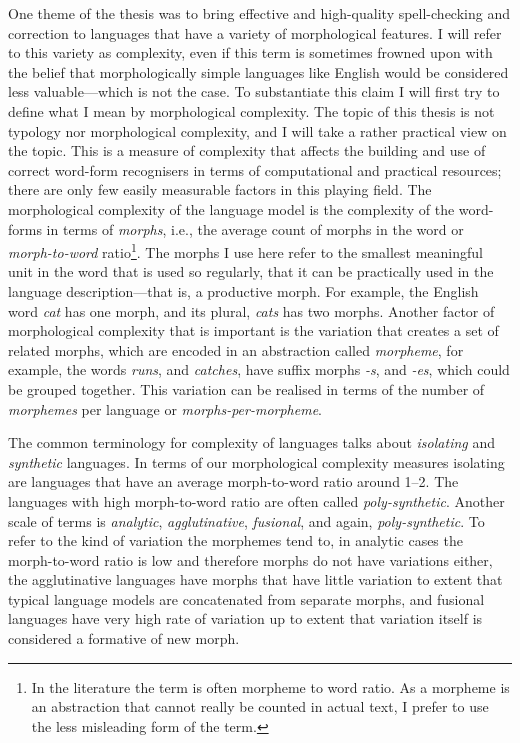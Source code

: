 \documentclass[officiallayout]{unihelcompling}
\begin{document}
One theme of the thesis was to bring effective and high-quality spell-checking
and correction
to languages that have a variety of morphological features. I will refer to
this variety as complexity, even if this term is sometimes frowned upon with
the belief that morphologically simple languages like English would be
considered less valuable---which is not the case.  To substantiate this claim I
will first try to define what I mean by morphological complexity. The topic of
this thesis is not typology nor morphological complexity, and I will take a
rather practical view on the topic.  This is a measure of complexity that
affects the building and use of correct word-form recognisers in terms of
computational and practical resources; there are only few easily measurable
factors in this playing field. The morphological complexity of the language model is the complexity of the word-forms
in terms of \emph{morphs}, i.e., the average count of morphs in the word or
\emph{morph-to-word} ratio\footnote{In the literature the term is often morpheme to
    word ratio. As a morpheme is an abstraction that cannot really be counted
    in actual text, I prefer to use the less misleading form of the term.}. The
    morphs I use here refer to the smallest meaningful unit in the word that is
    used so regularly, that it can be practically used in the language
    description---that is, a productive morph. For example, the English word
    \emph{cat} has one morph, and its plural, \emph{cats} has two morphs.
    Another factor of morphological complexity that is important is the
    variation that creates a set of related morphs, which are encoded in an
    abstraction called \emph{morpheme}, for example, the words \emph{runs}, and
    \emph{catches}, have suffix morphs \emph{-s}, and \emph{-es}, which could
    be grouped together. This variation can be realised in terms of the number of
    \emph{morphemes} per language or \emph{morphs-per-morpheme}.

The common terminology for complexity of languages talks about \emph{isolating}
and \emph{synthetic} languages. In terms of our morphological complexity
measures isolating are languages that have an average morph-to-word ratio around
1--2. The languages with high morph-to-word ratio are often called
\emph{poly-synthetic}. Another scale of terms is \emph{analytic},
\emph{agglutinative}, \emph{fusional}, and again, \emph{poly-synthetic}. To
refer to the kind of variation the morphemes tend to, in analytic cases the
morph-to-word ratio is low and therefore morphs do not have variations either,
the agglutinative languages have morphs that have little variation to extent
that typical language models are concatenated from separate morphs, and
fusional languages have very high rate of variation up to extent that variation
itself is considered a formative of new morph. 
\end{document}
